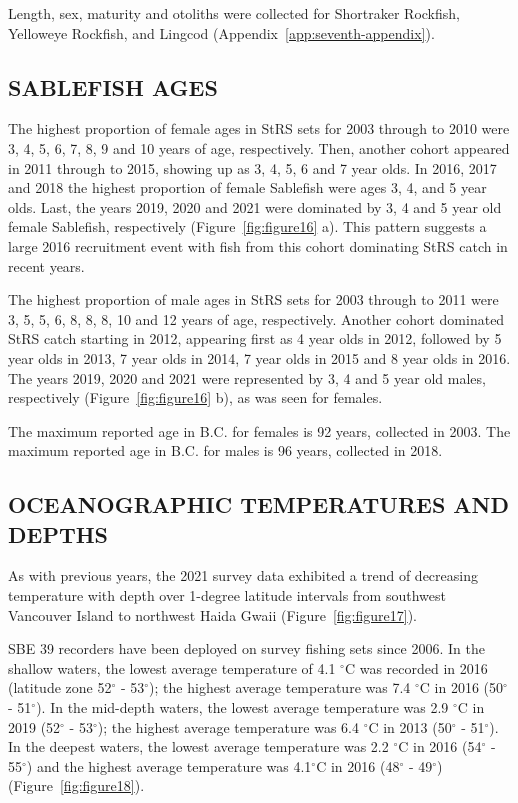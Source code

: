 \documentclass[12pt]{article}\usepackage[]{graphicx}\usepackage[]{color}
\begin{document}
Length, sex, maturity and otoliths were collected for Shortraker Rockfish, Yelloweye Rockfish, and Lingcod (Appendix~\ref{app:seventh-appendix}).

\hypertarget{sablefish-ages}{%
\subsection{SABLEFISH AGES}\label{sablefish-ages}}

The highest proportion of female ages in StRS sets for 2003 through to 2010 were 3, 4, 5, 6, 7, 8, 9 and 10 years of age, respectively. Then, another cohort appeared in 2011 through to 2015, showing up as 3, 4, 5, 6 and 7 year olds. In 2016, 2017 and 2018 the highest proportion of female Sablefish were ages 3, 4, and 5 year olds. Last, the years 2019, 2020 and 2021 were dominated by 3, 4 and 5 year old female Sablefish, respectively (Figure~\ref{fig:figure16} a). This pattern suggests a large 2016 recruitment event with fish from this cohort dominating StRS catch in recent years.

The highest proportion of male ages in StRS sets for 2003 through to 2011 were 3, 5, 5, 6, 8, 8, 8, 10 and 12 years of age, respectively. Another cohort dominated StRS catch starting in 2012, appearing first as 4 year olds in 2012, followed by 5 year olds in 2013, 7 year olds in 2014, 7 year olds in 2015 and 8 year olds in 2016. The years 2019, 2020 and 2021 were represented by 3, 4 and 5 year old males, respectively (Figure~\ref{fig:figure16} b), as was seen for females.

The maximum reported age in B.C. for females is 92 years, collected in 2003. The maximum reported age in B.C. for males is 96 years, collected in 2018.

\hypertarget{oceanographic-temperatures-and-depths}{%
\subsection{OCEANOGRAPHIC TEMPERATURES AND DEPTHS}\label{oceanographic-temperatures-and-depths}}

As with previous years, the 2021 survey data exhibited a trend of decreasing temperature with depth over 1-degree latitude intervals from southwest Vancouver Island to northwest Haida Gwaii (Figure~\ref{fig:figure17}).

SBE 39 recorders have been deployed on survey fishing sets since 2006. In the shallow waters, the lowest average temperature of 4.1 \(^\circ\)C was recorded in 2016 (latitude zone 52\(^\circ\) - 53\(^\circ\)); the highest average temperature was 7.4 \(^\circ\)C in 2016 (50\(^\circ\) - 51\(^\circ\)). In the mid-depth waters, the lowest average temperature was 2.9 \(^\circ\)C in 2019 (52\(^\circ\) - 53\(^\circ\)); the highest average temperature was 6.4 \(^\circ\)C in 2013 (50\(^\circ\) - 51\(^\circ\)). In the deepest waters, the lowest average temperature was 2.2 \(^\circ\)C in 2016 (54\(^\circ\) - 55\(^\circ\)) and the highest average temperature was 4.1\(^\circ\)C in 2016 (48\(^\circ\) - 49\(^\circ\)) (Figure~\ref{fig:figure18}).
\end{document}
